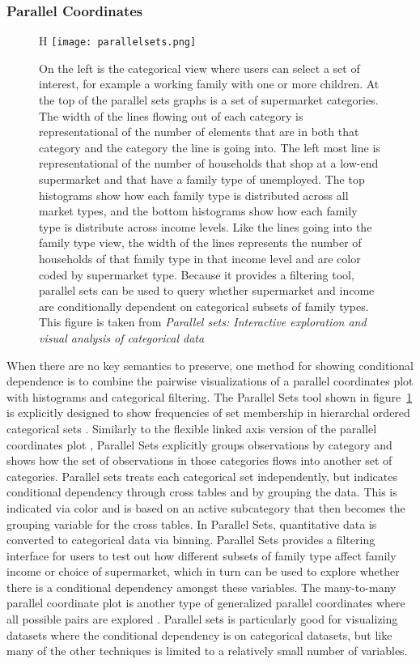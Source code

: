 \documentclass[../main.text]{subfiles}
\begin{document}
\subsubsection{Parallel Coordinates}
\label{sec:pcp}
\begin{figure}{H}
  \texttt{[image: parallelsets.png]}
  \caption{On the left is the categorical view where users can select a set of interest, for example a working family with one or more children. At the top of the parallel sets graphs is a set of supermarket categories. The width of the lines flowing out of each category is representational of the number of elements that are in both that category and the category the line is going into. The left most line is representational of the number of households that shop at a low-end supermarket and that have a family type of unemployed. The top histograms show how each family type is distributed across all market types, and the bottom histograms show how each family type is distribute across income levels. Like the lines going into the family type view, the width of the lines represents the number of households of that family type in that income level and are color coded by supermarket type. Because it provides a filtering tool, parallel sets can be used to query whether supermarket and income are conditionally dependent on categorical subsets of family types. This figure is taken from \textit{Parallel sets: Interactive exploration and visual analysis of categorical data} \cite{kosara_parallel_2006}}
  \label{fig:parallelsets}
\end{figure}

When there are no key semantics to preserve, one method for showing conditional dependence is to combine the pairwise visualizations of a parallel coordinates plot with histograms and categorical filtering. The Parallel Sets tool shown in figure~\ref{fig:parallelsets} is explicitly designed to show frequencies
of set membership in hierarchal ordered categorical sets \cite{kosara_parallel_2006}. Similarly to the flexible linked axis version of the parallel coordinates plot \cite{claessen_flexible_2011}, Parallel Sets explicitly groups observations by category and shows how the set of observations in those categories flows into another set of categories. Parallel sets treats each categorical set independently, but indicates conditional dependency through cross tables and by grouping the data. This is indicated via color and is based on an active subcategory that then becomes the grouping variable for the cross tables. In Parallel Sets, quantitative data is converted to categorical data via binning. Parallel Sets provides a filtering interface for users to test out how different subsets of family type affect family income or choice of supermarket, which in turn can be used to explore whether there is a conditional dependency amongst these variables. The many-to-many parallel coordinate plot is another type of generalized parallel coordinates where all possible pairs are explored \cite{lind_many--many_2009}. Parallel sets is particularly good for visualizing datasets where the conditional dependency is on categorical datasets, but like many of the other techniques is limited to a relatively small number of variables. 
\end{document}
